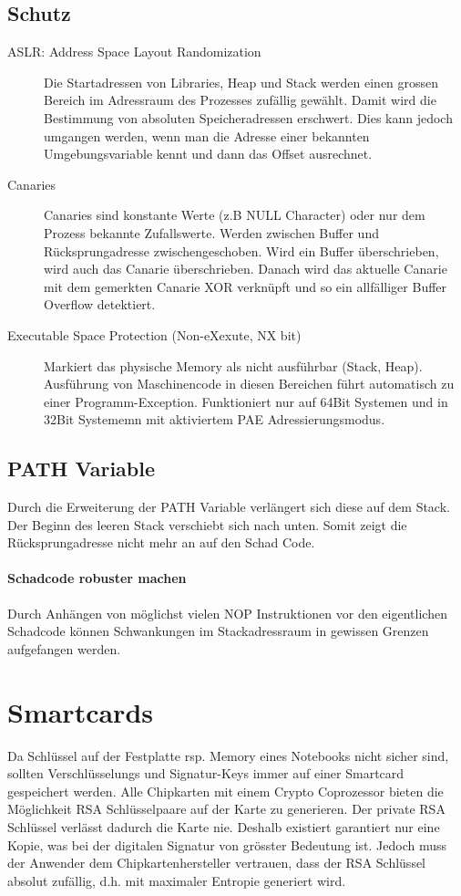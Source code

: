 \subsection{Schutz}
\begin{description}
	\item[ASLR: Address Space Layout Randomization] Die Startadressen von Libraries, Heap und Stack werden einen grossen Bereich im Adressraum des Prozesses zufällig gewählt. Damit wird die Bestimmung von absoluten Speicheradressen erschwert. Dies kann jedoch umgangen werden, wenn man die Adresse einer bekannten Umgebungsvariable kennt und dann das Offset ausrechnet.
	\item[Canaries] Canaries sind konstante Werte (z.B NULL Character) oder nur dem Prozess bekannte Zufallswerte. Werden zwischen Buffer und Rücksprungadresse zwischengeschoben. Wird ein Buffer überschrieben, wird auch das Canarie überschrieben. Danach wird das aktuelle Canarie mit dem gemerkten Canarie XOR verknüpft und so ein allfälliger Buffer Overflow detektiert.
	\item[Executable Space Protection (Non-eXexute, NX bit)] Markiert das physische Memory als nicht ausführbar (Stack, Heap). Ausführung von Maschinencode in diesen Bereichen führt automatisch zu einer Programm-Exception. Funktioniert nur auf 64Bit Systemen und in 32Bit Systememn mit aktiviertem PAE Adressierungsmodus.
\end{description}

\subsection{PATH Variable}
Durch die Erweiterung der PATH Variable verlängert sich diese auf dem Stack. Der Beginn des leeren Stack verschiebt sich nach unten. Somit zeigt die Rücksprungadresse nicht mehr an auf den Schad Code.

\paragraph{Schadcode robuster machen}
 Durch Anhängen von möglichst vielen NOP Instruktionen vor den eigentlichen Schadcode können Schwankungen im Stackadressraum in gewissen Grenzen aufgefangen werden.
 


\section{Smartcards}
Da Schlüssel auf der Festplatte rsp. Memory eines Notebooks nicht sicher sind, sollten Verschlüsselungs und Signatur-Keys immer auf einer Smartcard gespeichert werden. Alle Chipkarten mit einem Crypto Coprozessor bieten die Möglichkeit RSA Schlüsselpaare auf der Karte zu generieren. Der private RSA Schlüssel verlässt dadurch die Karte nie. Deshalb existiert garantiert nur eine Kopie, was bei der digitalen Signatur von grösster Bedeutung ist. Jedoch muss der Anwender dem Chipkartenhersteller vertrauen, dass der RSA Schlüssel absolut zufällig, d.h. mit maximaler Entropie generiert wird.


